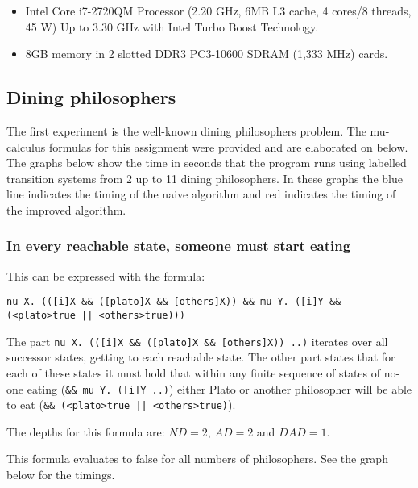\documentclass[10pt,a4paper]{article}
\begin{document}
\begin{itemize}
	\item Intel Core i7-2720QM Processor (2.20 GHz, 6MB L3 cache, 4 cores/8 threads, 45 W) Up to 3.30 GHz with Intel Turbo Boost Technology.
	
	\item 8GB memory in 2 slotted DDR3 PC3-10600 SDRAM (1,333 MHz) cards.
\end{itemize}

\subsection{Dining philosophers}
The first experiment is the well-known dining philosophers problem. The mu-calculus formulas for this assignment were provided and are elaborated on below.\\
The graphs below show the time in seconds that the program runs using labelled transition systems from 2 up to 11 dining philosophers. In these graphs the blue line indicates the timing of the naive algorithm and red indicates the timing of the improved algorithm.

\subsubsection{In every reachable state, someone must start eating}
This can be expressed with the formula:

\begin{center}
	\tt nu X. (([i]X \&\& ([plato]X \&\& [others]X)) \&\& mu Y. ([i]Y \&\& (<plato>true || <others>true)))
\end{center}	
	
The part {\tt nu X. (([i]X \&\& ([plato]X \&\& [others]X)) ..)} iterates over all successor states, getting to each reachable state. The other part states that for each of these states it must hold that within any finite sequence of states of no-one eating ({\tt \&\& mu Y. ([i]Y ..)}) either Plato or another philosopher will be able to eat ({\tt \&\& (<plato>true || <others>true)}).

The depths for this formula are: $ND = 2$, $AD = 2$ and $DAD = 1$.

This formula evaluates to false for all numbers of philosophers. See the graph below for the timings.

\end{document}
